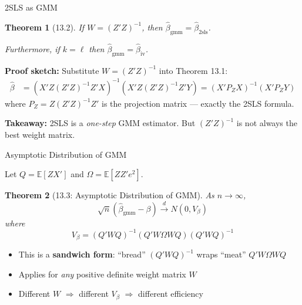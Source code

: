 \documentclass[aspectratio=169, handout, t]{beamer}
\newtheorem{thm}{Theorem}
\numberwithin{equation}{section}
\begin{document}
\begin{frame}{2SLS as GMM}

\begin{thm}[13.2]
If $W = (Z'Z)^{-1}$, then $\hat\beta_{\text{gmm}} = \hat\beta_{\text{2sls}}$.

Furthermore, if $k = \ell$ then $\hat\beta_{\text{gmm}} = \hat\beta_{\text{iv}}$.
\end{thm}

\medskip
\textbf{Proof sketch:} Substitute $W = (Z'Z)^{-1}$ into Theorem 13.1:
\begin{align*}
\hat\beta &= (X'Z(Z'Z)^{-1}Z'X)^{-1}(X'Z(Z'Z)^{-1}Z'Y) = (X'P_ZX)^{-1}(X'P_ZY)
\end{align*}
where $P_Z = Z(Z'Z)^{-1}Z'$ is the projection matrix --- exactly the 2SLS formula.

\medskip
\begin{tcolorbox}[colback=blue!5, colframe=blue!50]
\textbf{Takeaway:} 2SLS is a \textit{one-step} GMM estimator. But $(Z'Z)^{-1}$ is not always the best weight matrix.
\end{tcolorbox}

\end{frame}

\begin{frame}{Asymptotic Distribution of GMM}

Let $Q = \mathbb{E}[ZX']$ and $\Omega = \mathbb{E}[ZZ'e^2]$.

\begin{thm}[13.3: Asymptotic Distribution of GMM]
As $n \to \infty$,
$$\sqrt{n}(\hat\beta_{\text{gmm}} - \beta) \xrightarrow{d} N(0, V_\beta)$$
where
$$\boxed{V_\beta = (Q'WQ)^{-1}(Q'W\Omega WQ)(Q'WQ)^{-1}}$$
\end{thm}

\bigskip
\begin{itemize}
\item This is a \textbf{sandwich form}: ``bread'' $(Q'WQ)^{-1}$ wraps ``meat'' $Q'W\Omega WQ$
\item Applies for \textit{any} positive definite weight matrix $W$
\item Different $W$ $\Rightarrow$ different $V_\beta$ $\Rightarrow$ different efficiency
\end{itemize}

\end{frame}
\end{document}
